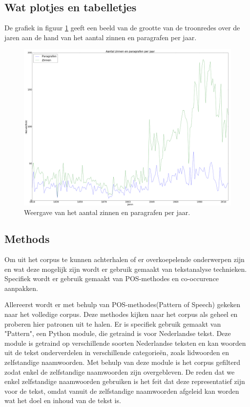 \subsection{Wat plotjes en tabelletjes}

De grafiek in figuur \ref{inhoud} geeft een beeld van de grootte van de troonredes over de jaren aan de hand van het aantal zinnen en paragrafen per jaar.


\begin{figure}[H]
\begin{center}
\includegraphics[width=1.2\textwidth]{fig/Inhoudverdeling}
\caption{\label{inhoud} Weergave van het aantal zinnen en paragrafen per jaar.}
\end{center}
\end{figure}

\pagebreak
\subsection{Methods}
Om uit het corpus te kunnen achterhalen of er overkoepelende onderwerpen zijn en wat deze mogelijk zijn wordt er gebruik gemaakt van tekstanalyse technieken. Specifiek wordt er gebruik gemaakt van POS-methodes en co-occurence aanpakken.~\cite{callon1991co}  

Allereerst wordt er met behulp van POS-methodes(Pattern of Speech) gekeken naar het volledige corpus. Deze methodes kijken naar het corpus als geheel en proberen hier patronen uit te halen. Er is specifiek gebruik gemaakt van "Pattern", een Python module, die getraind is voor Nederlandse tekst. Deze module is getraind op verschillende soorten Nederlandse teksten en kan woorden uit de tekst onderverdelen in verschillende categorieën, zoals lidwoorden en zelfstandige naamwoorden. Met behulp van deze module is het corpus gefilterd zodat enkel de zelfstandige naamwoorden zijn overgebleven. De reden dat we enkel zelfstandige naamwoorden gebruiken is het feit dat deze representatief zijn voor de tekst, omdat vanuit de zelfstandige naamwoorden afgeleid kan worden wat het doel en inhoud van de tekst is.

